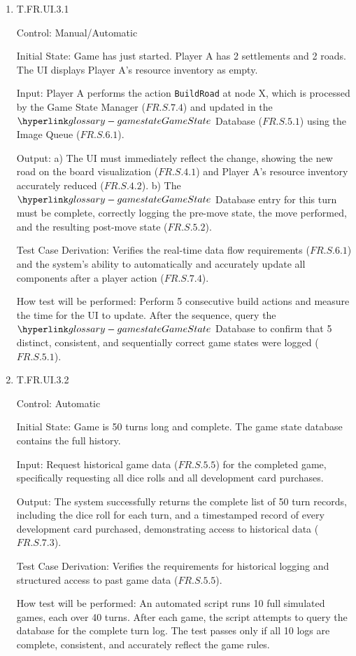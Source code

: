 \documentclass[12pt, titlepage]{article}
\begin{document}
\begin{enumerate}

\item{T.FR.UI.3.1\\}

Control: Manual/Automatic

Initial State: Game has just started.
Player A has 2 settlements and 2 roads. The UI displays Player A's resource inventory as empty.

Input: Player A performs the action \texttt{BuildRoad} at node X, which is processed by the Game State Manager ($\hyperref[FR.S.7.4]{FR.S.7.4}$) and updated in the $\GameState{}$ Database ($\hyperref[FR.S.5.1]{FR.S.5.1}$) using the Image Queue ($\hyperref[FR.S.6.1]{FR.S.6.1}$).

Output:
    a) The UI must immediately reflect the change, showing the new road on the board visualization ($\hyperref[FR.S.4.1]{FR.S.4.1}$) and Player A's resource inventory accurately reduced ($\hyperref[FR.S.4.2]{FR.S.4.2}$).
    b) The $\GameState{}$ Database entry for this turn must be complete, correctly logging the pre-move state, the move performed, and the resulting post-move state ($\hyperref[FR.S.5.2]{FR.S.5.2}$).

Test Case Derivation: Verifies the real-time data flow requirements ($\hyperref[FR.S.6.1]{FR.S.6.1}$) and the system's ability to automatically and accurately update all components after a player action ($\hyperref[FR.S.7.4]{FR.S.7.4}$).

How test will be performed: Perform 5 consecutive build actions and measure the time for the UI to update.
After the sequence, query the $\GameState{}$ Database to confirm that 5 distinct, consistent, and sequentially correct game states were logged ($\hyperref[FR.S.5.1]{FR.S.5.1}$).

\item{T.FR.UI.3.2\\}

Control: Automatic

Initial State: Game is 50 turns long and complete.
The game state database contains the full history.

Input: Request historical game data ($\hyperref[FR.S.5.5]{FR.S.5.5}$) for the completed game, specifically requesting all dice rolls and all development card purchases.

Output: The system successfully returns the complete list of 50 turn records, including the dice roll for each turn, and a timestamped record of every development card purchased, demonstrating access to historical data ($\hyperref[FR.S.7.3]{FR.S.7.3}$).

Test Case Derivation: Verifies the requirements for historical logging and structured access to past game data ($\hyperref[FR.S.5.5]{FR.S.5.5}$).

How test will be performed: An automated script runs 10 full simulated games, each over 40 turns.
After each game, the script attempts to query the database for the complete turn log.
The test passes only if all 10 logs are complete, consistent, and accurately reflect the game rules.

\end{enumerate}
\end{document}

